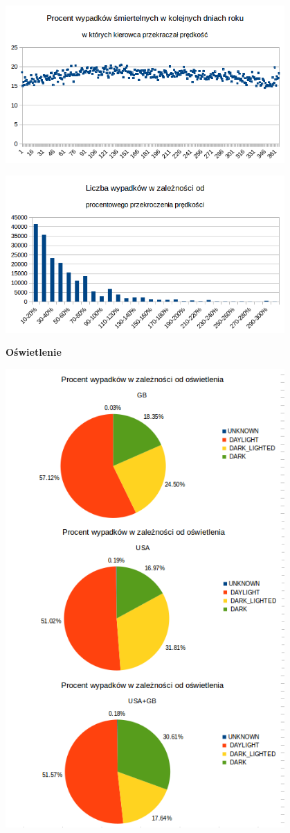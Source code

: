 \includegraphics[width=0.8\textwidth]{images/hipotheses/speed/speed_exceeded_by_day_of_year.png}

\includegraphics[width=0.8\textwidth]{images/hipotheses/speed/speed_exceeded_by_percent.png}

\textbf{Oświetlenie}

\includegraphics[width=0.8\textwidth]{images/hipotheses/lighting/lighting.png}

